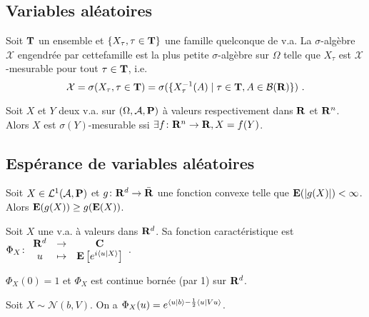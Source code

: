 \subsection{Variables aléatoires}

	\begin{defn}
		Soit $\mathbf{T}$ un ensemble et $\{ X_\tau, \tau \in \mathbf{T} \}$ une famille quelconque de v.a.
		La $\sigma$-algèbre $\mathcal{X}$ engendrée par cettefamille est la plus petite $\sigma$-algèbre sur $\Omega$ telle que $X_\tau$ est $\mathcal{X}$-mesurable pour tout $\tau \in \mathbf{T}$, i.e.
		$$\mathcal{X} = \sigma(X_\tau, \tau \in \T) = \sigma(\{ X_\tau^{-1}(A) \mid \tau \in \T, A \in \mathcal{B}(\R) \})\ .$$
	\end{defn}

	\begin{lem}
		Soit $X$ et $Y$ deux v.a. sur $(\Omega,\mathcal{A},\mathbf{P})$ à valeurs respectivement dans $\mathbf{R}$ et $\mathbf{R}^n$.
		Alors $X$ est $\sigma(Y)$-mesurable ssi $\exists f \colon \mathbf{R}^n \to \mathbf{R}, X = f(Y)$.
	\end{lem}


\subsection{Espérance de variables aléatoires}

	\begin{thm}
		Soit $X \in \mathcal{L}^1(\mathcal{A},\mathbf{P})$ et $g \colon \mathbf{R}^d \to \Bar{\mathbf{R}}$ une fonction convexe telle que $\mathbf{E}(\left\lvert g(X)\right\rvert) < \infty$.
		Alors $\mathbf{E}(g(X)) \geq g(\mathbf{E}(X))$.
	\end{thm}

	\begin{defn}
		Soit $X$ une v.a. à valeurs dans $\mathbf{R}^d$.
		Sa fonction caractéristique est $\Phi_X \colon \begin{array}{ccc}
			\mathbf{R}^d & \to & \mathbf{C} \\
			u & \mapsto & \mathbf{E} \left[ e^{i \left\langle u \mid X \right\rangle} \right]
		\end{array}$.
	\end{defn}

	\begin{lem}
		$\Phi_X(0) = 1$ et $\Phi_X$ est continue bornée (par 1) sur $\mathbf{R}^d$.
	\end{lem}

	\begin{pop}
		Soit $X \sim \mathcal{N}(b,V)$.
		On a $\Phi_X(u) = e^{\left\langle u \mid b \right\rangle - \frac{1}{2} \left\langle u \mid Vu \right\rangle}$.
	\end{pop}

